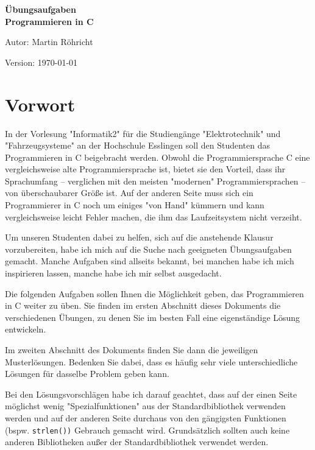 \documentclass{coding-exercises}
\begin{document}
\begin{titlepage}
  \centering

  {\fontsize{40}{48}\bfseries\lato Übungsaufgaben\\Programmieren in C\par}

  {\Large Autor: Martin Röhricht}

  \vfill
  Version: \today
\end{titlepage}


\frontmatter
\chapter{Vorwort}

In der Vorlesung "Informatik2" für die Studiengänge "Elektrotechnik" und
"Fahrzeugsysteme" an der Hochschule Esslingen soll den Studenten das
Programmieren in C beigebracht werden. Obwohl die Programmiersprache C eine
vergleichsweise alte Programmiersprache ist, bietet sie den Vorteil, dass ihr
Sprachumfang -- verglichen mit den meisten "modernen" Programmiersprachen --
von überschaubarer Größe ist. Auf der anderen Seite muss sich ein Programmierer
in C noch um einiges "von Hand" kümmern und kann vergleichsweise leicht Fehler
machen, die ihm das Laufzeitsystem nicht verzeiht.

Um unseren Studenten dabei zu helfen, sich auf die anstehende Klausur
vorzubereiten, habe ich mich auf die Suche nach geeigneten Übungsaufgaben
gemacht. Manche Aufgaben sind allseits bekannt, bei manchen habe ich mich
inspirieren lassen, manche habe ich mir selbst ausgedacht.

Die folgenden Aufgaben sollen Ihnen die Möglichkeit geben, das Programmieren in
C weiter zu üben. Sie finden im ersten Abschnitt dieses Dokuments die
verschiedenen Übungen, zu denen Sie im besten Fall eine eigenständige Lösung
entwickeln.

Im zweiten Abschnitt des Dokuments finden Sie dann die jeweiligen
Musterlösungen. Bedenken Sie dabei, dass es häufig sehr viele unterschiedliche
Lösungen für dasselbe Problem geben kann.

Bei den Lösungsvorschlägen habe ich darauf geachtet, dass auf der einen Seite
möglichst wenig "Spezialfunktionen" aus der Standardbibliothek verwenden werden
und auf der anderen Seite durchaus von den gängigsten Funktionen (bspw.
\texttt{strlen())} Gebrauch gemacht wird. Grundsätzlich sollten auch
keine anderen Bibliotheken außer der Standardbibliothek verwendet werden.
\end{document}
